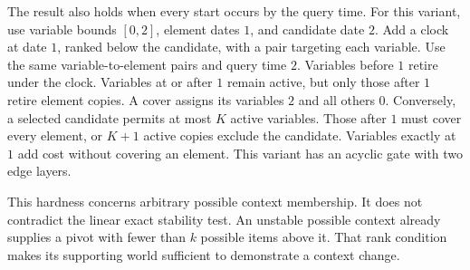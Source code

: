The result also holds when every start occurs by the query time.
For this variant, use variable bounds $[0,2]$, element dates $1$, and candidate date $2$.
Add a clock at date $1$, ranked below the candidate, with a pair targeting each variable.
Use the same variable-to-element pairs and query time $2$.
Variables before $1$ retire under the clock.
Variables at or after $1$ remain active, but only those after $1$ retire element copies.
A cover assigns its variables $2$ and all others $0$.
Conversely, a selected candidate permits at most $K$ active variables.
Those after $1$ must cover every element, or $K+1$ active copies exclude the candidate.
Variables exactly at $1$ add cost without covering an element.
This variant has an acyclic gate with two edge layers.

This hardness concerns arbitrary possible context membership.
It does not contradict the linear exact stability test.
An unstable possible context already supplies a pivot with fewer than $k$ possible items above it.
That rank condition makes its supporting world sufficient to demonstrate a context change.
